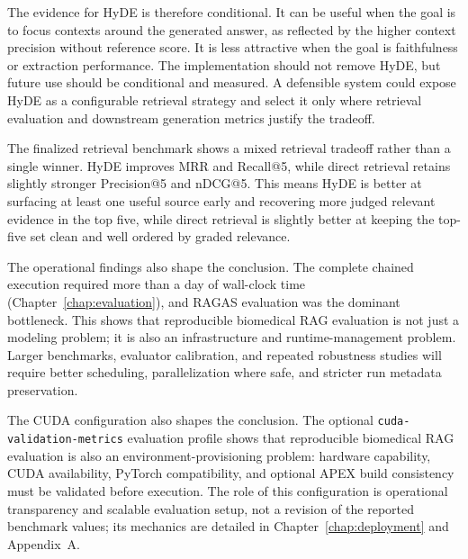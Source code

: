 The evidence for HyDE is therefore conditional. It can be useful when the goal is to focus contexts around the generated answer, as reflected by the higher context precision without reference score. It is less attractive when the goal is faithfulness or extraction performance. The implementation should not remove HyDE, but future use should be conditional and measured. A defensible system could expose HyDE as a configurable retrieval strategy and select it only where retrieval evaluation and downstream generation metrics justify the tradeoff.

The finalized retrieval benchmark shows a mixed retrieval tradeoff rather than a single winner. HyDE improves MRR and Recall@5, while direct retrieval retains slightly stronger Precision@5 and nDCG@5. This means HyDE is better at surfacing at least one useful source early and recovering more judged relevant evidence in the top five, while direct retrieval is slightly better at keeping the top-five set clean and well ordered by graded relevance.

The operational findings also shape the conclusion. The complete chained execution required more than a day of wall-clock time (Chapter~\ref{chap:evaluation}), and RAGAS evaluation was the dominant bottleneck. This shows that reproducible biomedical RAG evaluation is not just a modeling problem; it is also an infrastructure and runtime-management problem. Larger benchmarks, evaluator calibration, and repeated robustness studies will require better scheduling, parallelization where safe, and stricter run metadata preservation.

The CUDA configuration also shapes the conclusion. The optional \texttt{cuda-validation-metrics} evaluation profile shows that reproducible biomedical RAG evaluation is also an environment-provisioning problem: hardware capability, CUDA availability, PyTorch compatibility, and optional APEX build consistency must be validated before execution. The role of this configuration is operational transparency and scalable evaluation setup, not a revision of the reported benchmark values; its mechanics are detailed in Chapter~\ref{chap:deployment} and Appendix~A.

